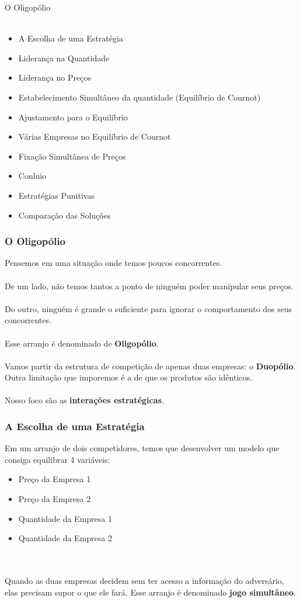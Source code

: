 \documentclass{beamer}[10]
\begin{document}
\begin{frame}
	\huge O Oligopólio \normalsize
	\\~\\
	\begin{itemize}
		\item A Escolha de uma Estratégia
		\item Liderança na Quantidade
		\item Liderança no Preços
		\item Estabelecimento Simultâneo da quantidade (Equilíbrio de Cournot)
		\item Ajustamento para o Equilíbrio
		\item Várias Empresas no Equilíbrio de Cournot
		\item Fixação Simultânea de Preços
		\item Conluio
		\item Estratégias Punitivas
		\item Comparação das Soluções
	\end{itemize}
\end{frame}

\begin{frame}
	\frametitle{O Oligopólio}

	Pensemos em uma situação onde temos poucos concorrentes.
	\\~\\
	De um lado, não temos tantos a ponto de ninguém poder manipular seus preços.
	\\~\\
	Do outro, ninguém é grande o suficiente para ignorar o comportamento dos seus concorrentes. 
	\\~\\
	Esse arranjo é denominado de \textbf{Oligopólio}.
	\\~\\
	Vamos partir da estrutura de competição de apenas duas empresas: o \textbf{Duopólio}. Outra limitação que imporemos é a de que os produtos são idênticos.
	\\~\\
	Nosso foco são as \textbf{interações estratégicas}.

\end{frame}

\begin{frame}
	\frametitle{A Escolha de uma Estratégia}

	Em um arranjo de dois competidores, temos que desenvolver um modelo que consiga equilibrar 4 variáveis:

	\begin{itemize}
		\item Preço da Empresa 1
		\item Preço da Empresa 2
		\item Quantidade da Empresa 1
		\item Quantidade da Empresa 2
	\end{itemize}
	\ 
	\\~\\
	Quando as duas empresas decidem sem ter acesso a informação do adversário, elas precisam supor o que ele fará. Esse arranjo é denominado \textbf{jogo simultâneo}.

\end{frame}
\end{document}
